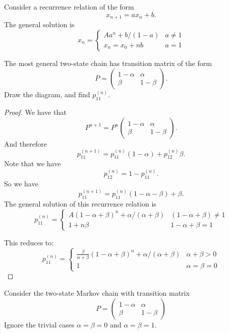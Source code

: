 \begin{thm}
Consider a recurrence relation of the form
\[
x_{n+1}=ax_{n}+b.
\]
The general solution is
\[
x_{n}=\begin{cases}Aa^n+b/(1-a) &a\neq 1\\ x_{n}=x_{0}+nb &a=1\end{cases}
\]
\end{thm}

\begin{thm}[Example 1.1.4]
The most general two-state chain has transition matrix of the form
\[
P= \begin{pmatrix}1-\alpha &\alpha  \\ \beta &1-\beta \end{pmatrix}.
\]
Draw the diagram, and find \(p_{11}^{(n)}.\)
\end{thm}

\begin{proof}

We have that
\[
P^{n+1}=P^n\begin{pmatrix}1-\alpha &\alpha  \\ \beta &1-\beta \end{pmatrix}.
\]
And therefore
\[
p_{11}^{(n+1)}=p_{11}^{(n)}(1-\alpha )+ p_{12}^{(n)}\beta .
\]
Note that we have
\[
p_{12}^{(n)}=1-p_{11}^{(n)}.
\]
So we have
\[
p_{11}^{(n+1)}=p_{11}^{(n)}(1-\alpha -\beta )+ \beta .
\]
The general solution of this recurrence relation is
\[
p_{11}^{(n)}=
\begin{cases}A(1-\alpha +\beta )^n+\alpha /(\alpha +\beta ) &(1-\alpha +\beta )\neq 1 \\
1+n\beta  &1-\alpha +\beta =1\end{cases}
\]

This reduces to:
\[
p_{11}^{(n)}=
\begin{cases}\frac{\beta }{\alpha +\beta } (1-\alpha +\beta )^n+\alpha /(\alpha +\beta ) &\alpha +\beta >0 \\
1 &\alpha =\beta =0\end{cases}
\]

\end{proof}


\begin{prop}
Consider the two-state Markov chain with transition matrix
\[
P=
\begin{pmatrix}1-\alpha &\alpha \\
\beta &1-\beta \end{pmatrix}
\]
Ignore the trivial cases \(\alpha =\beta =0\) and \(\alpha =\beta =1.\)
\end{prop}

